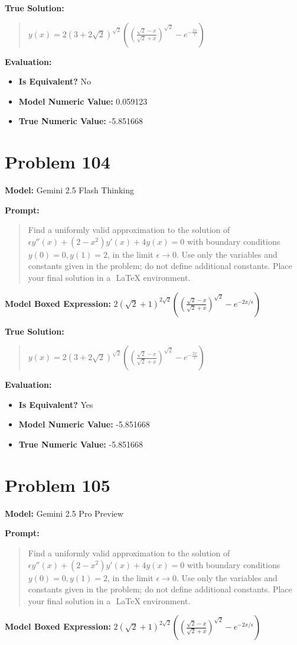 \documentclass{article}
\begin{document}
{\textbf{True Solution:}
\begin{quote}
$y(x)=2(3+2\sqrt{2})^\sqrt{2}((\frac{\sqrt{2}-x}{\sqrt{2}+x})^\sqrt{2}-e^{-\frac{2x}{\epsilon}})$
\end{quote}

\textbf{Evaluation:}
\begin{itemize}
\item \textbf{Is Equivalent?} No
\item \textbf{Model Numeric Value:} 0.059123
\item \textbf{True Numeric Value:} -5.851668
\end{itemize}
\vspace{1cm}
\section*{Problem 104}
\textbf{Model:} Gemini 2.5 Flash Thinking

\textbf{Prompt:}
\begin{quote}
Find a uniformly valid approximation to the solution of $\epsilon y''(x) + (2 - x^2) y'(x) + 4 y(x) = 0$ with boundary conditions $y(0) = 0, y(1) = 2$, in the limit $\epsilon \to 0$. Use only the variables and constants given in the problem; do not define additional constants. Place your final solution in a $\boxed{}$ LaTeX environment.
\end{quote}
\textbf{Model Boxed Expression:} $2(\sqrt{2}+1)^{2\sqrt{2}} \left( \left(\frac{\sqrt{2}-x}{\sqrt{2}+x}\right)^{\sqrt{2}} - e^{-2x/\epsilon} \right)$

\textbf{True Solution:}
\begin{quote}
$y(x)=2(3+2\sqrt{2})^\sqrt{2}((\frac{\sqrt{2}-x}{\sqrt{2}+x})^\sqrt{2}-e^{-\frac{2x}{\epsilon}})$
\end{quote}

\textbf{Evaluation:}
\begin{itemize}
\item \textbf{Is Equivalent?} Yes
\item \textbf{Model Numeric Value:} -5.851668
\item \textbf{True Numeric Value:} -5.851668
\end{itemize}
\vspace{1cm}
\section*{Problem 105}
\textbf{Model:} Gemini 2.5 Pro Preview

\textbf{Prompt:}
\begin{quote}
Find a uniformly valid approximation to the solution of $\epsilon y''(x) + (2 - x^2) y'(x) + 4 y(x) = 0$ with boundary conditions $y(0) = 0, y(1) = 2$, in the limit $\epsilon \to 0$. Use only the variables and constants given in the problem; do not define additional constants. Place your final solution in a $\boxed{}$ LaTeX environment.
\end{quote}
\textbf{Model Boxed Expression:} $2(\sqrt{2}+1)^{2\sqrt{2}} \left( \left(\frac{\sqrt{2}-x}{\sqrt{2}+x}\right)^{\sqrt{2}} - e^{-2x/\epsilon} \right)$

}
\end{document}
